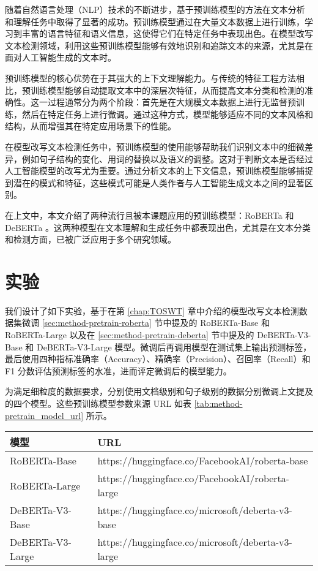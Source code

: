 随着自然语言处理（NLP）技术的不断进步，基于预训练模型的方法在文本分析和理解任务中取得了显著的成功。预训练模型通过在大量文本数据上进行训练，学习到丰富的语言特征和语义信息，这使得它们在特定任务中表现出色。在模型改写文本检测领域，利用这些预训练模型能够有效地识别和追踪文本的来源，尤其是在面对人工智能生成的文本时。

预训练模型的核心优势在于其强大的上下文理解能力。与传统的特征工程方法相比，预训练模型能够自动提取文本中的深层次特征，从而提高文本分类和检测的准确性。这一过程通常分为两个阶段：首先是在大规模文本数据上进行无监督预训练，然后在特定任务上进行微调。通过这种方式，模型能够适应不同的文本风格和结构，从而增强其在特定应用场景下的性能。

在模型改写文本检测任务中，预训练模型的使用能够帮助我们识别文本中的细微差异，例如句子结构的变化、用词的替换以及语义的调整。这对于判断文本是否经过人工智能模型的改写尤为重要。通过分析文本的上下文信息，预训练模型能够捕捉到潜在的模式和特征，这些模式可能是人类作者与人工智能生成文本之间的显著区别。

在上文中，本文介绍了两种流行且被本课题应用的预训练模型：RoBERTa \cite{liu_roberta_2019} 和 DeBERTa \cite{he_deberta_2021, he2023debertav3improvingdebertausing}。这两种模型在文本理解和生成任务中都表现出色，尤其是在文本分类和检测方面，已被广泛应用于多个研究领域。

\section{实验}
\label{sec:method-experiment}

我们设计了如下实验，基于在第 \ref{chap:TOSWT} 章中介绍的模型改写文本检测数据集微调 \ref{sec:method-pretrain-roberta} 节中提及的 RoBERTa-Base 和 RoBERTa-Large 以及在 \ref{sec:method-pretrain-deberta} 节中提及的 DeBERTa-V3-Base 和 DeBERTa-V3-Large 模型。微调后再调用模型在测试集上输出预测标签，最后使用四种指标准确率（Accuracy）、精确率（Precision）、召回率（Recall）和 F1 分数评估预测标签的水准，进而评定微调后的模型能力。

为满足细粒度的数据要求，分别使用文档级别和句子级别的数据分别微调上文提及的四个模型。这些预训练模型参数来源 URL 如表 \ref{tab:method-pretrain_model_url} 所示。

\begin{table*}[htbp]
\centering
\caption{预训练模型参数来源 URL} \label{tab:method-pretrain_model_url}
\begin{tabular}{ll}
\toprule
\textbf{模型}      & \textbf{URL}                                                                 \\ \midrule
RoBERTa-Base \cite{liu_roberta_2019}     & https://huggingface.co/FacebookAI/roberta-base    \\
RoBERTa-Large \cite{liu_roberta_2019}   & https://huggingface.co/FacebookAI/roberta-large   \\
DeBERTa-V3-Base \cite{he2023debertav3improvingdebertausing}  & https://huggingface.co/microsoft/deberta-v3-base  \\
DeBERTa-V3-Large \cite{he2023debertav3improvingdebertausing} & https://huggingface.co/microsoft/deberta-v3-large \\ \bottomrule
\end{tabular}
\end{table*}

